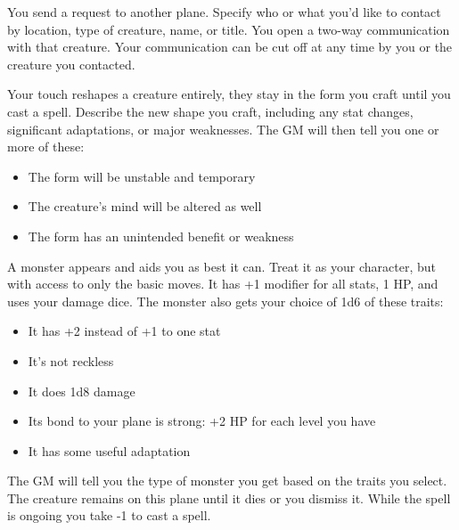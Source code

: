 
You send a request to another plane. Specify who or what you'd like to contact by location, type of creature, name, or title. You open a two-way communication with that creature. Your communication can be cut off at any time by you or the creature you contacted.



Your touch reshapes a creature entirely, they stay in the form you craft until you cast a spell. Describe the new shape you craft, including any stat changes, significant adaptations, or major weaknesses. The GM will then tell you one or more of these:
\begin{itemize}
\item The form will be unstable and temporary
\item The creature's mind will be altered as well
\item The form has an unintended benefit or weakness

\end{itemize}

\newpage
{}


A monster appears and aids you as best it can. Treat it as your character, but with access to only the basic moves. It has +1 modifier for all stats, 1 HP, and uses your damage dice. The monster also gets your choice of 1d6 of these traits: 
\begin{itemize}
\item It has +2 instead of +1 to one stat
\item It's not reckless
\item It does 1d8 damage
\item Its bond to your plane is strong: +2 HP for each level you have
\item It has some useful adaptation

\end{itemize}

The GM will tell you the type of monster you get based on the traits you select. The creature remains on this plane until it dies or you dismiss it. While the spell is ongoing you take -1 to cast a spell.


